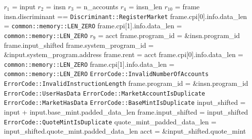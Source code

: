 \begin{algorithm}
\caption{MARKET-PDA-PRELUDE}
\begin{algorithmic}
  \INPUT $r_1$ = input
  \INPUT $r_2$ = insn
  \INPUT $r_3$ = n\_accounts
  \INPUT $r_4$ = insn\_len
  \INPUT $r_{10}$ = frame
  \REQUIRE insn.discriminant == \texttt{Discriminant::RegisterMarket}
  \REQUIRE frame.cpi[0].info.data\_len = \texttt{common::memory::LEN\_ZERO}
  \REQUIRE frame.cpi[1].info.data\_len = \texttt{common::memory::LEN\_ZERO}
  \ENSURE $r_9$ = acct
  \ENSURE frame.program\_id = \&insn.program\_id
  \ENSURE frame.input\_shifted
  \ENSURE frame.system\_program\_id = \&input.system\_program.address
  \ENSURE frame.rent = acct
  \ENSURE frame.cpi[0].info.data\_len = \texttt{common::memory::LEN\_ZERO}
  \ENSURE frame.cpi[1].info.data\_len = \texttt{common::memory::LEN\_ZERO}
    \RETURN \texttt{ErrorCode::InvalidNumberOfAccounts}
  \ENDIF
    \RETURN \texttt{ErrorCode::InvalidInstructionLength}
  \ENDIF
  \STATE frame.program\_id = \&insn.program\_id
    \RETURN \texttt{ErrorCode::UserHasData}
  \ENDIF
    \RETURN \texttt{ErrorCode::MarketAccountIsDuplicate}
  \ENDIF
    \RETURN \texttt{ErrorCode::MarketHasData}
  \ENDIF
    \RETURN \texttt{ErrorCode::BaseMintIsDuplicate}
  \ENDIF
  \STATE input\_shifted = input + input.base\_mint.padded\_data\_len
  \STATE frame.input\_shifted = input\_shifted
    \RETURN \texttt{ErrorCode::QuoteMintIsDuplicate}
  \ENDIF
  \STATE quote\_mint\_padded\_data\_len = input\_shifted.quote\_mint.padded\_data\_len
  \STATE acct = \&input\_shifted.quote\_mint

\end{algorithmic}
\end{algorithm}
